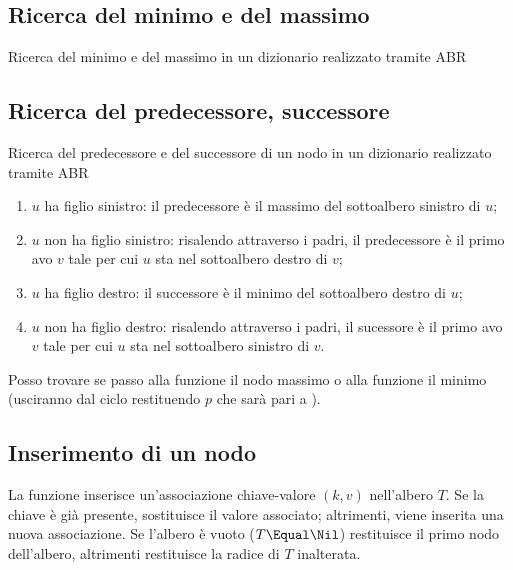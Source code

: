 \clearpage
\subsection*{Ricerca del minimo e del massimo}

\begin{algorithm}[H]
	\caption{Ricerca del minimo e del massimo in un dizionario realizzato tramite \textsc{ABR}}
	
\end{algorithm}

\subsection*{Ricerca del predecessore, successore}

\begin{algorithm}[H]
	\caption{Ricerca del predecessore e del successore di un nodo in un dizionario realizzato tramite \textsc{ABR}}
	
\end{algorithm}

\begin{enumerate}[label={\footnotesize\ttfamily (\arabic*)}]
	\item \(u\) ha figlio sinistro: il predecessore è il massimo del sottoalbero sinistro di \(u\);
	\item \(u\) non ha figlio sinistro: risalendo attraverso i padri, il predecessore è il primo avo \(v\) tale per cui \(u\) sta nel sottoalbero destro di \(v\);
	\item \(u\) ha figlio destro: il successore è il minimo del sottoalbero destro di \(u\);
	\item \(u\) non ha figlio destro: risalendo attraverso i padri, il sucessore è il primo avo \(v\) tale per cui \(u\) sta nel sottoalbero sinistro di \(v\).
\end{enumerate}

\begin{note}
Posso trovare \Nil se passo alla funzione \succNode il nodo massimo o alla funzione \predNode il minimo (usciranno dal ciclo restituendo \(p\) che sarà pari a \Nil).
\end{note}

\clearpage
\subsection*{Inserimento di un nodo}

La funzione \insertNode inserisce un'associazione chiave-valore \((k,v)\) nell'albero \(T\).
Se la chiave è già presente, sostituisce il valore associato;
altrimenti, viene inserita una nuova associazione.
Se l'albero è vuoto (\(T \Equal \Nil\)) restituisce il primo nodo dell'albero, altrimenti restituisce la radice di \(T\) inalterata.

